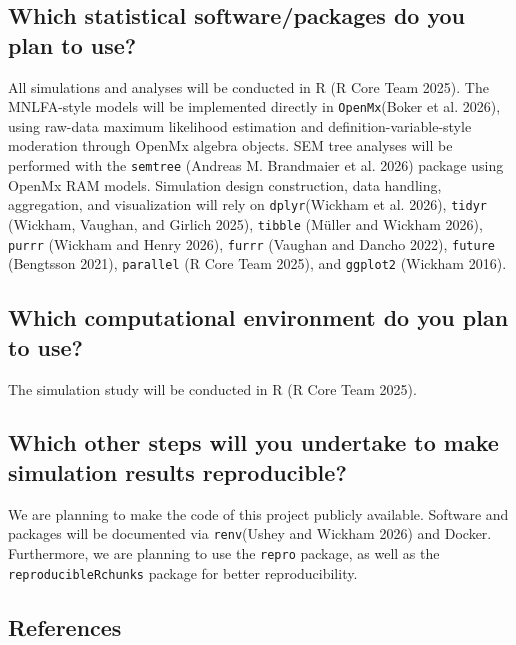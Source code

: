 \documentclass[
  man,
  floatsintext]{apa7}
\begin{document}
\subsection{Which statistical software/packages do you plan to
use?}\label{which-statistical-softwarepackages-do-you-plan-to-use}

All simulations and analyses will be conducted in R (R Core Team 2025).
The MNLFA-style models will be implemented directly in
\texttt{OpenMx}(Boker et al. 2026), using raw-data maximum likelihood
estimation and definition-variable-style moderation through OpenMx
algebra objects. SEM tree analyses will be performed with the
\texttt{semtree} (Andreas M. Brandmaier et al. 2026) package using
OpenMx RAM models. Simulation design construction, data handling,
aggregation, and visualization will rely on \texttt{dplyr}(Wickham et
al. 2026), \texttt{tidyr} (Wickham, Vaughan, and Girlich 2025),
\texttt{tibble} (Müller and Wickham 2026), \texttt{purrr} (Wickham and
Henry 2026), \texttt{furrr} (Vaughan and Dancho 2022), \texttt{future}
(Bengtsson 2021), \texttt{parallel} (R Core Team 2025), and
\texttt{ggplot2} (Wickham 2016).

\subsection{Which computational environment do you plan to
use?}\label{which-computational-environment-do-you-plan-to-use}

The simulation study will be conducted in R (R Core Team 2025).

\subsection{Which other steps will you undertake to make simulation
results
reproducible?}\label{which-other-steps-will-you-undertake-to-make-simulation-results-reproducible}

We are planning to make the code of this project publicly available.
Software and packages will be documented via \texttt{renv}(Ushey and
Wickham 2026) and Docker. Furthermore, we are planning to use the
\texttt{repro} package, as well as the \texttt{reproducibleRchunks}
package for better reproducibility.

\pagebreak

\subsection*{References}\label{references}
\end{document}
